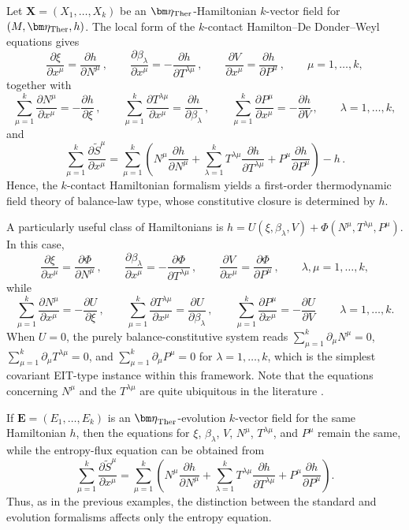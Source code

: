 \documentclass[11pt,twoside]{article}
\theoremstyle{plain}
\theoremstyle{definition}
\theoremstyle{remark}
\begin{document}
Let ${\bm X}=(X_1,\dots,X_k)$ be an $\bm\eta_{\rm Ther}$-Hamiltonian $k$-vector field for $
(M,\bm\eta_{\rm Ther},h)$. The local form of the $k$-contact Hamilton--De Donder--Weyl equations gives
\[
\frac{\partial \xi}{\partial x^\mu}=\frac{\partial h}{\partial N^\mu}\,,\qquad
\frac{\partial \beta_\lambda}{\partial x^\mu}=-\frac{\partial h}{\partial T^{\lambda\mu}}\,,\qquad
\frac{\partial V}{\partial x^\mu}=\frac{\partial h}{\partial P^\mu}\,,\qquad \mu=1,\ldots,k,
\]
together with
\[
\sum_{\mu=1}^k\frac{\partial N^\mu}{\partial x^\mu}=-\frac{\partial h}{\partial \xi}\,,\qquad
\sum_{\mu=1}^k\frac{\partial T^{\lambda\mu}}{\partial x^\mu}=\frac{\partial h}{\partial \beta_\lambda}\,,\qquad
\sum_{\mu=1}^k\frac{\partial P^\mu}{\partial x^\mu}=-\frac{\partial h}{\partial V}\,,\qquad \lambda=1,\ldots,k,
\]
and
\[
\sum_{\mu=1}^k\frac{\partial \widetilde{S}^\mu}{\partial x^\mu}
=
\sum_{\mu=1}^k\left(
N^\mu\frac{\partial h}{\partial N^\mu}
+\sum_{\lambda=1}^k T^{\lambda\mu}\frac{\partial h}{\partial T^{\lambda\mu}}
+P^\mu\frac{\partial h}{\partial P^\mu}
\right)-h\,.
\]
Hence, the $k$-contact Hamiltonian formalism yields a first-order thermodynamic field theory of balance-law type, whose constitutive closure is determined by $h$.

A particularly useful class of Hamiltonians is $h=U(\xi,\beta_\lambda,V)+\Phi(N^\mu,T^{\lambda\mu},P^\mu)$. In this case,
\[
\frac{\partial \xi}{\partial x^\mu}=\frac{\partial\Phi}{\partial N^\mu}\,,\qquad
\frac{\partial \beta_\lambda}{\partial x^\mu}=-\frac{\partial\Phi}{\partial T^{\lambda\mu}}\,,\qquad
\frac{\partial V}{\partial x^\mu}=\frac{\partial\Phi}{\partial P^\mu}\,,\qquad \lambda,\mu=1,\ldots,k,
\]
while
\[
\sum_{\mu=1}^k\frac{\partial N^\mu}{\partial x^\mu}=-\frac{\partial U}{\partial \xi}\,,\qquad
\sum_{\mu=1}^k\frac{\partial T^{\lambda\mu}}{\partial x^\mu}=\frac{\partial U}{\partial \beta_\lambda}\,,\qquad
\sum_{\mu=1}^k\frac{\partial P^\mu}{\partial x^\mu}=-\frac{\partial U}{\partial V}\,\qquad \lambda=1,\ldots,k.
\]
When $U=0$, the purely balance-constitutive system reads $\sum_{\mu=1}^k\partial_\mu N^\mu=0$, $\sum_{\mu=1}^k\partial_\mu T^{\lambda\mu}=0$, and $\sum_{\mu=1}^k\partial_\mu P^\mu=0$ for $\lambda=1,\ldots,k$, which is the simplest covariant EIT-type instance within this framework. Note that the equations concerning $N^\mu$ and the $T^{\lambda\mu}$ are quite ubiquitous in the literature \cite{HLM_26,IsraelStewart1979}. 

If ${\bm E}=(E_1,\dots,E_k)$ is an ${\bm \eta}_{\rm Ther}$-evolution $k$-vector field for the same Hamiltonian $h$, then the equations for $\xi$, $\beta_\lambda$, $V$, $N^\mu$, $T^{\lambda\mu}$, and $P^\mu$ remain the same, while the entropy-flux equation can be obtained from 
\[
\sum_{\mu=1}^k\frac{\partial \widetilde{S}^\mu}{\partial x^\mu}
=
\sum_{\mu=1}^k\left(
N^\mu\frac{\partial h}{\partial N^\mu}
+\sum_{\lambda=1}^k T^{\lambda\mu}\frac{\partial h}{\partial T^{\lambda\mu}}
+P^\mu\frac{\partial h}{\partial P^\mu}
\right).
\]
Thus, as in the previous examples, the distinction between the standard and evolution formalisms affects only the entropy equation.
\end{document}
